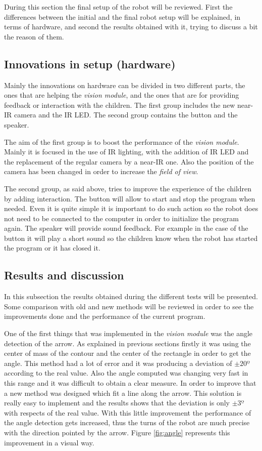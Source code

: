 During this section the final setup of the robot will be reviewed. First the differences between the initial and the final robot setup will be explained, in terms of hardware, and second the results obtained with it, trying to discuss a bit the reason of them.

\subsection{Innovations in setup (hardware)}

Mainly the innovations on hardware can be divided in two different parts, the ones that are helping the \textit{vision module}, and the ones that are for providing feedback or interaction with the children. The first group includes the new near-IR camera and the IR LED. The second group contains the button and the speaker.

The aim of the first group is to boost the performance of the \textit{vision module}. Mainly it is focused in the use of IR lighting, with the addition of IR LED and the replacement of the regular camera by a near-IR one. Also the position of the camera has been changed in order to increase the \textit{field of view}.

The second group, as said above, tries to improve the experience of the children by adding interaction. The button will allow to start and stop the program when needed. Even it is quite simple it is important to do such action so the robot does not need to be connected to the computer in order to initialize the program again. The speaker will provide sound feedback. For example in the case of the button it will play a short sound so the children know when the robot has started the program or it has closed it.


\subsection{Results and discussion}

In this subsection the results obtained during the different tests will be presented. Some comparison with old and new methods will be reviewed in order to see the improvements done and the performance of the current program. 

One of the first things that was implemented in the \textit{vision module} was the angle detection of the arrow. As explained in previous sections firstly it was using the center of mass of the contour and the center of the rectangle in order to get the angle. This method had a lot of error and it was producing a deviation of $\pm 20º$ according to the real value. Also the angle computed was changing very fast in this range and it was difficult to obtain a clear measure. In order to improve that a new method was designed which fit a line along the arrow. This solution is really easy to implement and the results shows that the deviation is only $\pm 3º$ with respects of the real value. With this little improvement the performance of the angle detection gets increased, thus the turns of the robot are much precise with the direction pointed by the arrow. Figure \ref{fig:angle} represents this improvement in a visual way.

